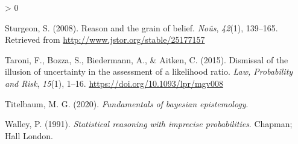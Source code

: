 \documentclass[
  10pt,
  dvipsnames,enabledeprecatedfontcommands]{scrartcl}
\newlength{\cslhangindent}
\newenvironment{CSLReferences}[2] %
 {%
  \setlength{\parindent}{0pt}
  \ifodd #1 \everypar{\setlength{\hangindent}{\cslhangindent}}\ignorespaces\fi
  \ifnum #2 > 0
  \setlength{\parskip}{#2\baselineskip}
  \fi
 }%
 {}
\begin{document}
\begin{CSLReferences}{1}{0}
\leavevmode\hypertarget{ref-Sturgeon2008grain}{}%
Sturgeon, S. (2008). Reason and the grain of belief. \emph{No{û}s},
\emph{42}(1), 139--165. Retrieved from
\url{http://www.jstor.org/stable/25177157}

\leavevmode\hypertarget{ref-Taroni2015Dismissal}{}%
Taroni, F., Bozza, S., Biedermann, A., \& Aitken, C. (2015). {Dismissal
of the illusion of uncertainty in the assessment of a likelihood ratio}.
\emph{Law, Probability and Risk}, \emph{15}(1), 1--16.
\url{https://doi.org/10.1093/lpr/mgv008}

\leavevmode\hypertarget{ref-Titelbaum2020Fundamentals-of}{}%
Titelbaum, M. G. (2020). \emph{Fundamentals of bayesian epistemology}.

\leavevmode\hypertarget{ref-walley1991statistical}{}%
Walley, P. (1991). \emph{Statistical reasoning with imprecise
probabilities}. Chapman; Hall London.

\end{CSLReferences}
\end{document}
